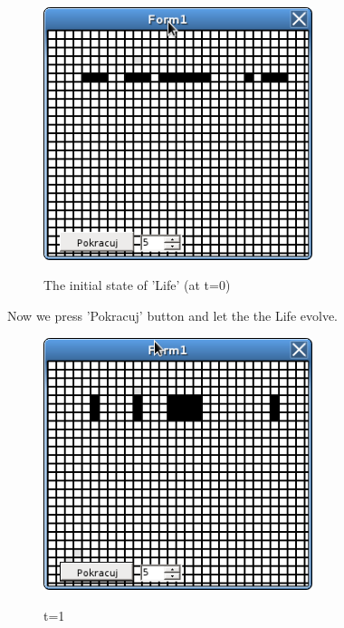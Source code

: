 \begin{figure}[htbp]
 \centering
 \includegraphics[width=0.7\textwidth]{./img/gol1}
 \label{gol1}
 \caption{The initial state of 'Life' (at t=0)}
\end{figure}


Now we press 'Pokracuj' button and let the the Life evolve.

\begin{figure}
 \centering
 \includegraphics[width=0.7\textwidth]{./img/gol2}
 \label{gol2}
 \caption{t=1}
\end{figure}

